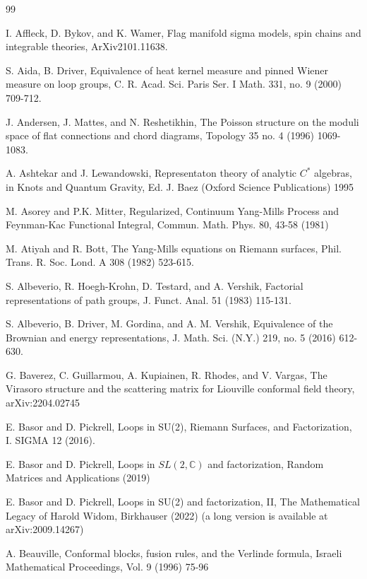 \documentclass{amsart}
\theoremstyle{conjecture}
\theoremstyle{definition}
\theoremstyle{question}
\theoremstyle{questions}
\theoremstyle{remark}
\theoremstyle{remarks}
\theoremstyle{example}
\numberwithin{equation}{section}
\begin{document}
\begin{thebibliography}{99}


 I. Affleck, D. Bykov, and K. Wamer, Flag manifold sigma models,
spin chains and integrable theories, ArXiv2101.11638.

 S. Aida, B. Driver, Equivalence of heat kernel measure and pinned Wiener
measure on loop groups, C. R. Acad. Sci. Paris Ser. I Math. 331, no. 9 (2000) 709-712.


J. Andersen, J. Mattes, and N. Reshetikhin,
The Poisson structure on the moduli space of flat connections and chord diagrams,
Topology 35 no. 4 (1996) 1069-1083.

 A. Ashtekar and J. Lewandowski, Representaton theory of analytic $C^*$ algebras, in Knots and Quantum Gravity, 
Ed. J. Baez (Oxford Science Publications) 1995

 M. Asorey and P.K. Mitter, Regularized, Continuum Yang-Mills Process
and Feynman-Kac Functional Integral, Commun. Math. Phys. 80, 43-58 (1981)

 M.  Atiyah and R.  Bott, The Yang-Mills
equations on Riemann surfaces, Phil.  Trans.  R.  Soc.
Lond.  A 308 (1982) 523-615.

 S.  Albeverio, R.  Hoegh-Krohn, D.
Testard, and A.  Vershik, Factorial representations of
path groups, J.  Funct.  Anal.  51 (1983) 115-131.

S. Albeverio, B. Driver, M. Gordina, and A. M. Vershik,
Equivalence of the Brownian and energy representations,
J. Math. Sci. (N.Y.) 219, no. 5 (2016) 612-630.

 G. Baverez, C. Guillarmou, A. Kupiainen, R. Rhodes, and V. Vargas,
The Virasoro structure and the scattering matrix for Liouville conformal field theory,
arXiv:2204.02745

 E. Basor and D. Pickrell, Loops in SU(2), Riemann Surfaces, and Factorization, I.
SIGMA 12 (2016).

 E. Basor and D. Pickrell, Loops in $SL(2,\mathbb C)$ and factorization,
Random Matrices and Applications (2019)

 E. Basor and D. Pickrell, Loops in SU(2) and factorization, II,
The Mathematical Legacy of Harold Widom, Birkhauser (2022) (a long version is
available at arXiv:2009.14267)

 A.  Beauville, Conformal blocks, fusion
rules, and the Verlinde formula, Israeli Mathematical
Proceedings, Vol.  9 (1996) 75-96


\end{thebibliography}
\end{document}
